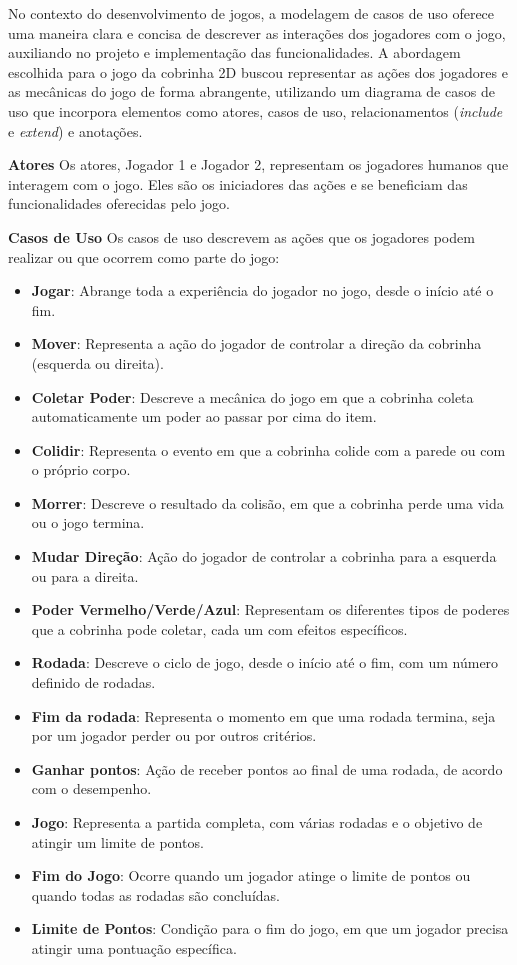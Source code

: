 No contexto do desenvolvimento de jogos, a modelagem de casos de uso oferece uma maneira clara e concisa de descrever as interações dos jogadores com o jogo, auxiliando no projeto e implementação das funcionalidades. A abordagem escolhida para o jogo da cobrinha 2D buscou representar as ações dos jogadores e as mecânicas do jogo de forma abrangente, utilizando um diagrama de casos de uso que incorpora elementos como atores, casos de uso, relacionamentos (\textit{include} e \textit{extend}) e anotações.

\textbf{Atores}
Os atores, Jogador 1 e Jogador 2, representam os jogadores humanos que interagem com o jogo. Eles são os iniciadores das ações e se beneficiam das funcionalidades oferecidas pelo jogo.

\textbf{Casos de Uso}
Os casos de uso descrevem as ações que os jogadores podem realizar ou que ocorrem como parte do jogo:

\begin{itemize}
  \item \textbf{Jogar}: Abrange toda a experiência do jogador no jogo, desde o início até o fim.
  \item \textbf{Mover}: Representa a ação do jogador de controlar a direção da cobrinha (esquerda ou direita).
  \item \textbf{Coletar Poder}: Descreve a mecânica do jogo em que a cobrinha coleta automaticamente um poder ao passar por cima do item.
  \item \textbf{Colidir}: Representa o evento em que a cobrinha colide com a parede ou com o próprio corpo.
  \item \textbf{Morrer}: Descreve o resultado da colisão, em que a cobrinha perde uma vida ou o jogo termina.
  \item \textbf{Mudar Direção}: Ação do jogador de controlar a cobrinha para a esquerda ou para a direita.
  \item \textbf{Poder Vermelho/Verde/Azul}: Representam os diferentes tipos de poderes que a cobrinha pode coletar, cada um com efeitos específicos.
  \item \textbf{Rodada}: Descreve o ciclo de jogo, desde o início até o fim, com um número definido de rodadas.
  \item \textbf{Fim da rodada}: Representa o momento em que uma rodada termina, seja por um jogador perder ou por outros critérios.
  \item \textbf{Ganhar pontos}: Ação de receber pontos ao final de uma rodada, de acordo com o desempenho.
  \item \textbf{Jogo}: Representa a partida completa, com várias rodadas e o objetivo de atingir um limite de pontos.
  \item \textbf{Fim do Jogo}: Ocorre quando um jogador atinge o limite de pontos ou quando todas as rodadas são concluídas.
  \item \textbf{Limite de Pontos}: Condição para o fim do jogo, em que um jogador precisa atingir uma pontuação específica.
\end{itemize}


